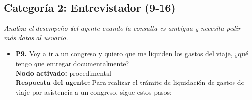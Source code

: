 \documentclass{article}
\begin{document}
\subsection{Categoría 2: Entrevistador (9-16)}
\textit{Analiza el desempeño del agente cuando la consulta es ambigua y necesita pedir más datos al usuario.}
\begin{itemize}
      \item \textbf{P9.} Voy a ir a un congreso y quiero que me liquiden los gastos del viaje, ¿qué tengo que entregar documentalmente? \\
            \textbf{Nodo activado:} procedimental \\
            \textbf{Respuesta del agente:} Para realizar el trámite de liquidación de gastos de viaje por asistencia a un congreso, sigue estos pasos:


\end{itemize}
\end{document}
